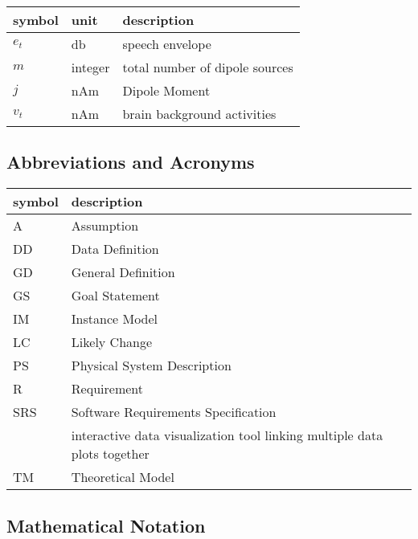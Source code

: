 \documentclass[12pt]{article}
\begin{document}
\renewcommand{\arraystretch}{1.2}
\noindent \begin{longtable*}{l l p{12cm}} \toprule
\textbf{symbol} & \textbf{unit} & \textbf{description}\\
\midrule
$e_t$ & db & speech envelope\\
$m$ & integer & total number of dipole sources\\
$j$ & nAm & Dipole Moment\\
$v_t$ & nAm & brain background activities\\

\bottomrule
\end{longtable*}

\subsection{Abbreviations and Acronyms}

\renewcommand{\arraystretch}{1.2}%
\begin{tabular}{l l}
  \toprule
  \textbf{symbol} & \textbf{description}\\
  \midrule
  A & Assumption\\
  DD & Data Definition\\
  GD & General Definition\\
  GS & Goal Statement\\
  IM & Instance Model\\
  LC & Likely Change\\
  PS & Physical System Description\\
  R & Requirement\\
  SRS & Software Requirements Specification\\
  \progname{} & interactive data visualization tool linking multiple data plots together\\
  TM & Theoretical Model\\
  \bottomrule
\end{tabular}
\subsection{Mathematical Notation}
\end{document}
